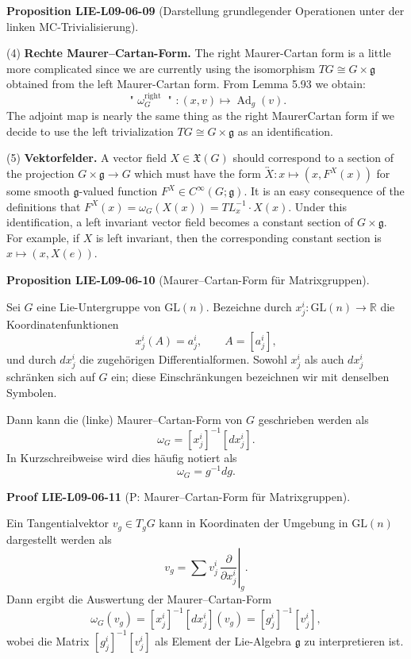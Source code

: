\documentclass[10pt, letterpaper]{article}
\newcommand{\GL}{\mathrm{GL}}
\newcommand{\CustomHeading}[3]{%
  \par\medskip\noindent%
  \textbf{#1 #2} \textnormal{(#3)}.\enskip%
}
\newenvironment{PROP}[2]{\CustomHeading{Proposition}{#1}{#2}}{}
\newenvironment{PROOF}[2]{\CustomHeading{Proof}{#1}{#2}}{}
\begin{document}
\begin{PROP}{LIE-L09-06-09}{Darstellung grundlegender Operationen unter der linken MC-Trivialisierung}
(4) \textbf{Rechte Maurer--Cartan-Form.} The right Maurer-Cartan form is a little more complicated since we are currently using the isomorphism $T G \cong G \times \mathfrak{g}$ obtained from the left Maurer-Cartan form. From Lemma 5.93 we obtain:
$$
\text { " } \omega_{G}^{\text {right }} \text { " }:(x, v) \mapsto \operatorname{Ad}_{g}(v) .
$$
The adjoint map is nearly the same thing as the right MaurerCartan form if we decide to use the left trivialization $T G \cong G \times \mathfrak{g}$ as an identification.


(5) \textbf{Vektorfelder.} A vector field $X \in \mathfrak{X}(G)$ should correspond to a section of the projection $G \times \mathfrak{g} \rightarrow G$ which must have the form $\overleftrightarrow{X}: x \mapsto\left(x, F^{X}(x)\right)$ for some smooth $\mathfrak{g}$-valued function $F^{X} \in C^{\infty}(G ; \mathfrak{g})$. It is an easy consequence of the definitions that $F^{X}(x)=\omega_{G}(X(x))= T L_{x}^{-1} \cdot X(x)$. Under this identification, a left invariant vector field becomes a constant section of $G \times \mathfrak{g}$. For example, if $X$ is left invariant, then the corresponding constant section is $x \mapsto(x, X(e))$.
\end{PROP}

\begin{PROP}{LIE-L09-06-10}{Maurer--Cartan-Form für Matrixgruppen}
Sei $G$ eine Lie-Untergruppe von $\GL(n)$.  
Bezeichne durch $x^i_j:\GL(n)\to\mathbb R$ die Koordinatenfunktionen
\[
x^i_j(A)=a^i_j,\qquad A=[a^i_j],
\]
und durch $dx^i_j$ die zugehörigen Differentialformen.  
Sowohl $x^i_j$ als auch $dx^i_j$ schränken sich auf $G$ ein;  
diese Einschränkungen bezeichnen wir mit denselben Symbolen.  

Dann kann die (linke) Maurer--Cartan-Form von $G$ geschrieben werden als
\[
\omega_G = [x^i_j]^{-1}[dx^i_j].
\]
In Kurzschreibweise wird dies häufig notiert als
\[
\omega_G = g^{-1}dg.
\]
\end{PROP}

\begin{PROOF}{LIE-L09-06-11}{P: Maurer--Cartan-Form für Matrixgruppen}
Ein Tangentialvektor $v_g\in T_gG$ kann in Koordinaten der Umgebung
in $\GL(n)$ dargestellt werden als
\[
v_g=\sum v^i_j\,
\left.\frac{\partial}{\partial x^i_j}\right|_g.
\]
Dann ergibt die Auswertung der Maurer--Cartan-Form
\[
\omega_G(v_g)
=[x^i_j]^{-1}[dx^i_j](v_g)
=[g^i_j]^{-1}[v^i_j],
\]
wobei die Matrix $[g^i_j]^{-1}[v^i_j]$ als Element der Lie-Algebra
$\mathfrak g$ zu interpretieren ist.
\end{PROOF}
\end{document}
